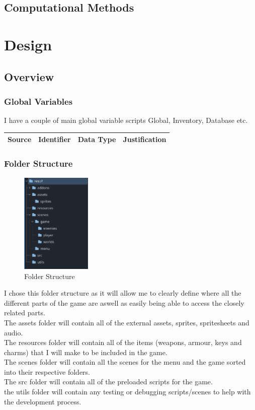 \documentclass{article}
\begin{document}
        \subsection{Computational Methods}
\newpage
\section{Design}
        \subsection{Overview}
        \subsubsection{Global Variables}
        I have a couple of main global variable scripts Global, Inventory, Database etc.\\
        \begin{tabular}{|c|c|c|c|}
                \hline
                Source&Identifier&Data Type&Justification\\
                \hline
        \end{tabular}
        \subsubsection{Folder Structure}
        \begin{figure}[H]
                \centering
                \includegraphics[width = 0.3\textwidth]{images/design/File_System.PNG}
                \caption{Folder Structure}
        \end{figure}
        I chose this folder structure as it will allow me to clearly define where all the different parts of the game are aswell as easily being able to access the closely related parts.\\
        The assets folder will contain all of the external assets, sprites, spritesheets and audio.\\
        The resources folder will contain all of the items (weapons, armour, keys and charms) that I will make to be included in the game.\\
        The scenes folder will contain all the scenes for the menu and the game sorted into their respective folders.\\
        The src folder will contain all of the preloaded scripts for the game.\\
        the utils folder will contain any testing or debugging scripts/scenes to help with the development process.\\
\end{document}

